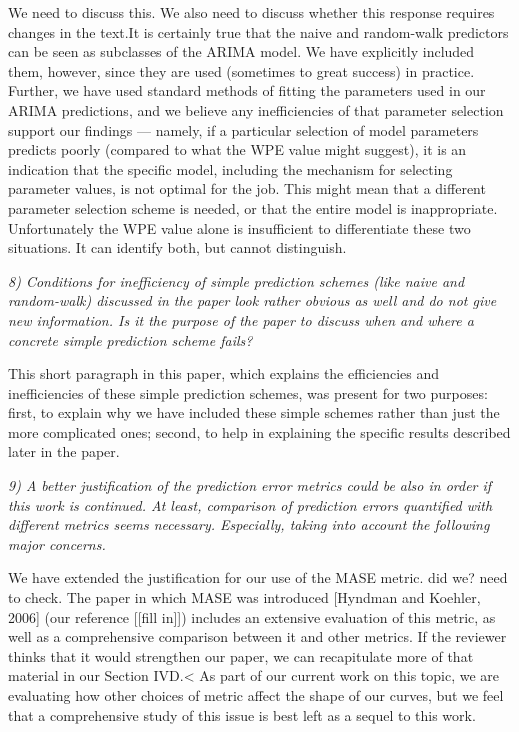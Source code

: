 \documentclass[12pt]{article}
\newcommand{\alert}[1]{{\color{red}#1}}
\begin{document}
\alert{We need to discuss this.  We also need to discuss whether this
  response requires changes in the text.It is certainly true that the
  naive and random-walk predictors can be seen as subclasses of the
  ARIMA model. We have explicitly included them, however, since they
  are used (sometimes to great success) in practice. Further, we have
  used standard methods of fitting the parameters used in our ARIMA
  predictions, and we believe any inefficiencies of that parameter
  selection support our findings --- namely, if a particular selection
  of model parameters predicts poorly (compared to what the WPE value
  might suggest), it is an indication that the specific model,
  including the mechanism for selecting parameter values, is not
  optimal for the job. This might mean that a different parameter
  selection scheme is needed, or that the entire model is
  inappropriate.  Unfortunately the WPE value alone is insufficient to
  differentiate these two situations.  It can identify both, but
  cannot distinguish.}

\emph{8) Conditions for inefficiency of simple prediction schemes (like naive
and random-walk) discussed in the paper look rather obvious as well and do not
give new information. Is it the purpose of the paper to discuss when and where a
concrete simple prediction scheme fails?}

This short paragraph in this paper, which explains the efficiencies
and inefficiencies of these simple prediction schemes, was present for
two purposes: first, to explain why we have included these simple
schemes rather than just the more complicated ones; second, to help in
explaining the specific results described later in the paper.

\emph{9) A better justification of the prediction error metrics could
  be also in order if this work is continued. At least, comparison of
  prediction errors quantified with different metrics seems
  necessary. Especially, taking into account the following major
  concerns.}

We have extended the justification for our use of the MASE metric.
\alert{did we?  need to check.}  The paper in which MASE was
introduced [Hyndman and Koehler, 2006] (our reference \alert{[[fill
      in]])} includes an extensive evaluation of this metric, as well
as a comprehensive comparison between it and other metrics.  If the
reviewer thinks that it would strengthen our paper, we can
recapitulate more of that material in our Section IVD.<  As part of our
current work on this topic, we are evaluating how other choices of
metric affect the shape of our curves, but we feel that a
comprehensive study of this issue is best left as a sequel to this
work.
\end{document}
